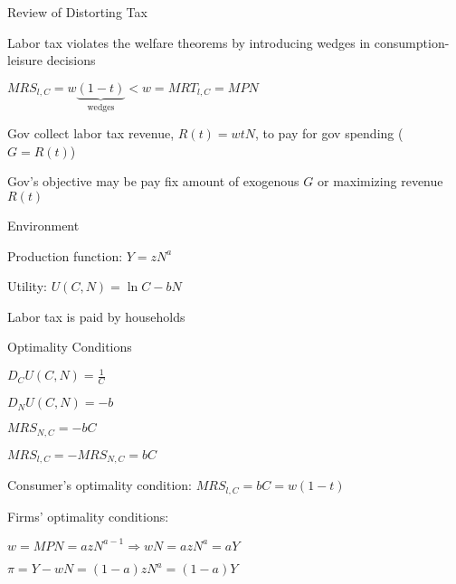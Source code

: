\documentclass[11pt,aspectratio=169,usenames,dvipsnames]{beamer}
\let\tempone\itemize
\let\temptwo\enditemize
\renewenvironment{itemize}{\tempone\addtolength{\itemsep}{\fill}}{\temptwo}
\let\tempa\enumerate
\let\tempb\endenumerate
\renewenvironment{enumerate}{\tempa\addtolength{\itemsep}{\fill}}{\tempb}
\begin{document}
\begin{frame}{Review of Distorting Tax}
\label{slide:Review_of_Distorting_Tax}
    \begin{enumerate}
        \item Labor tax violates the welfare theorems by introducing \alert{wedges} in consumption-leisure decisions
        \begin{itemize}
            \item $ MRS_{l, C} = w\underbrace{(1-t)}_{\text{wedges}} < w = MRT_{l, C} = MPN $
        \end{itemize}
        \item Gov collect labor tax revenue, $ R(t) = w t N $, to pay for gov spending ($G = R(t)$)
        \item Gov's objective may be \alert{pay fix amount of exogenous $ G $} or \alert{maximizing revenue $ R(t) $}
    \end{enumerate}


\end{frame}

\begin{frame}{Environment}
\label{slide:Environment}
    \begin{itemize}
        \item Production function: $ Y = z N^{a} $
        \item Utility: $U(C, N) = \ln C - b N$
        \item Labor tax is paid by households
    \end{itemize}

\end{frame}

\begin{frame}{Optimality Conditions}
\label{slide:Optimality_Conditions}
    \begin{itemize}
        \item $ D_{C}U(C, N) = \frac{1}{C} $
        \item $ D_{N}U(C, N) = -b $
        \item $ MRS_{N, C} = -bC $
        \item $ MRS_{l, C} = - MRS_{N, C} = bC $
        \item Consumer's optimality condition: $ MRS_{l, C} = bC = w(1-t) $
        \item Firms' optimality conditions:
        \begin{itemize}
            \item $ w = MPN = a z N^{a-1} \Rightarrow wN = a z N^{a} = a Y $
            \item $ \pi = Y - wN = (1-a) z N^{a} = (1-a)Y  $
        \end{itemize}

    \end{itemize}

\end{frame}
\end{document}
